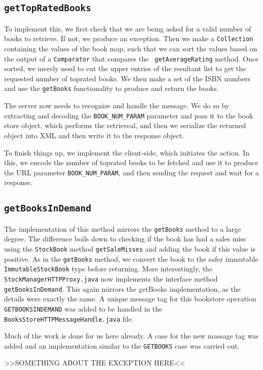 \subsection{\tt getTopRatedBooks}
To implement this, we first check that we are being asked for a valid number of
books to retrieve. If not, we produce an exception. Then we make a
{\tt Collection} containing the values of the book map, such that we can sort
the values based on the output of a {\tt Comparator} that compares the {\tt
getAverageRating} method. Once sorted, we merely need to cut the upper entries
of the resultant list to get the requested number of toprated books. We then
make a set of the ISBN numbers and use the {\tt getBooks} functionality to
produce and return the books.

The server now needs to recognize and handle the message. We do so by
extracting and decoding the {\tt BOOK\_NUM\_PARAM} parameter and pass it to the
book store object, which performs the retrieveal, and then we serialize the
returned object into XML and then write it to the response object.

To finish things up, we implement the client-side, which initiates the action.
In this, we encode the number of toprated books to be fetched and use it to
produce the URL parameter {\tt BOOK\_NUM\_PARAM}, and then sending the request
and wait for a response.

\subsection{\tt getBooksInDemand}

The implementation of this method mirrors the {\tt getBooks} method to a large degree. The difference boils down to checking if the book has had a sales miss using the {\tt StockBook} method {\tt getSaleMisses} and adding the book if this value is positive. As in the {\tt getBooks} method, we convert the book to the safer immutable {\tt ImmutableStockBook} type before returning. More interestingly, the {\tt StockManagerHTTPProxy.java} now implements the interface method {\tt getBooksInDemand}. This again mirrors the {getBooks} implementation, as the details were exactly the same. A unique message tag for this bookstore operation {\tt GETBOOKSINDEMAND} was added to be handled in the {\tt BooksStoreHTTPMessageHandle.java} file.

Much of the work is done for us here already. A case for the new massage tag was added and an implementation similar to the {\tt GETBOOKS} case was carried out.

>>SOMETHING ABOUT THE EXCEPTION HERE<<

